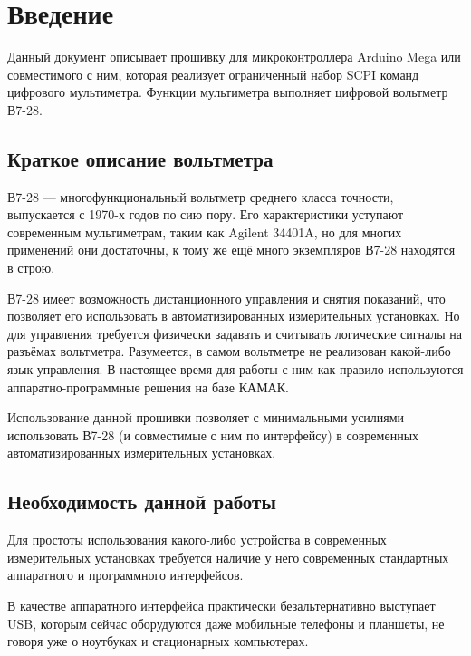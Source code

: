 \documentclass[12pt, a4paper]{article}
\newcommand{\SCPI}{\mbox{SCPI}}
\newcommand{\V}{\mbox{В7-28}}
\newcommand{\Arduino}{Arduino Mega}
\begin{document}
\maketitle

\section{Введение}

Данный документ описывает прошивку для микроконтроллера \Arduino{} или совместимого с ним, которая реализует ограниченный набор \SCPI{} команд цифрового мультиметра. Функции мультиметра выполняет цифровой вольтметр \V.

\subsection{Краткое описание вольтметра}

\V{} --- многофункциональный вольтметр среднего класса точности, выпускается с 1970-х годов по сию пору. Его характеристики уступают современным мультиметрам, таким как Agilent \mbox{34401A}, но для многих применений они достаточны, к тому же ещё много экземпляров \V{} находятся в строю.

\V{} имеет возможность дистанционного управления и снятия показаний, что позволяет его использовать в автоматизированных измерительных установках. Но для управления требуется физически задавать и считывать логические сигналы на разъёмах вольтметра. Разумеется, в самом вольтметре не реализован какой-либо язык управления. В настоящее время для работы с ним как правило используются аппаратно-программные решения на базе КАМАК.

Использование данной прошивки позволяет с минимальными усилиями использовать \V{} (и совместимые с ним по интерфейсу) в современных автоматизированных измерительных установках.

\subsection{Необходимость данной работы}

Для простоты использования какого-либо устройства в современных измерительных установках требуется наличие у него современных стандартных аппаратного и программного интерфейсов.

В качестве аппаратного интерфейса практически безальтернативно выступает USB, которым сейчас оборудуются даже мобильные телефоны и планшеты, не говоря уже о ноутбуках и стационарных компьютерах.
\end{document}
